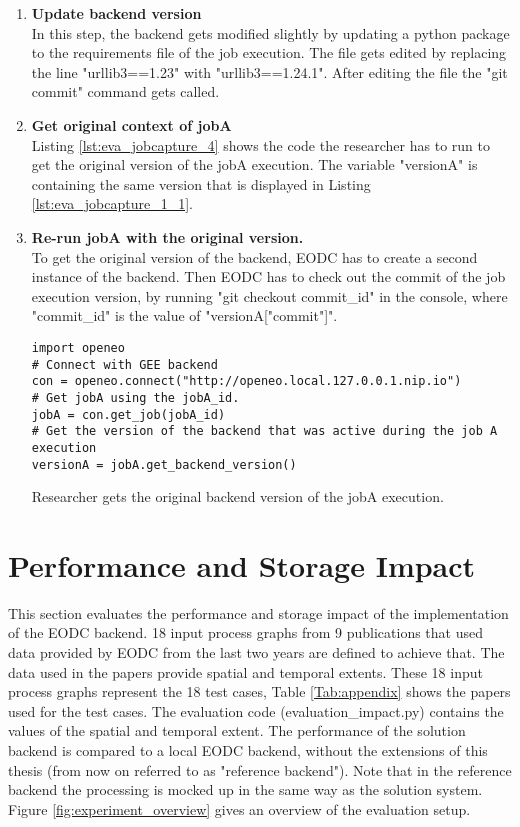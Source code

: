 \documentclass[draft,final]{vutinfth} %
\newenvironment{code}{\captionsetup{type=listing}}{}
\begin{document}
\begin{enumerate}
	\item \textbf{Update backend version} \\
	In this step, the backend gets modified slightly by updating a python package to the requirements file of the job execution. The file gets edited by replacing the line "urllib3==1.23" with "urllib3==1.24.1". After editing the file the "git commit" command gets called. 
	\item \textbf{Get original context of jobA} \\
	Listing \ref{lst:eva_jobcapture_4} shows the code the researcher has to run to get the original version of the jobA execution. The variable "versionA" is containing the same version that is displayed in Listing \ref{lst:eva_jobcapture_1_1}. 
	\item \textbf{Re-run jobA with the original version.} \\
	To get the original version of the backend, EODC has to create a second instance of the backend. Then EODC has to check out the commit of the job execution version, by running "git checkout commit\_id" in the console, where "commit\_id" is the value of "versionA["commit"]".
	\begin{code}
		\begin{verbatim}
import openeo
# Connect with GEE backend
con = openeo.connect("http://openeo.local.127.0.0.1.nip.io")
# Get jobA using the jobA_id.
jobA = con.get_job(jobA_id)
# Get the version of the backend that was active during the job A execution
versionA = jobA.get_backend_version()
		\end{verbatim}
		\caption{Researcher gets the original backend version of the jobA execution.}
		\label{lst:eva_jobcapture_4}
	\end{code}	
	
\end{enumerate}

\section{Performance and Storage Impact}\label{Evaluation:impact}

This section evaluates the performance and storage impact of the implementation of the EODC backend. 18 input process graphs from 9 publications that used data provided by EODC from the last two years are defined to achieve that. The data used in the papers provide spatial and temporal extents. These 18 input process graphs represent the 18 test cases, Table \ref{Tab:appendix} shows the papers used for the test cases. The evaluation code (evaluation\_impact.py) contains the values of the spatial and temporal extent. The performance of the solution backend is compared to a local EODC backend, without the extensions of this thesis (from now on referred to as "reference backend"). Note that in the reference backend the processing is mocked up in the same way as the solution system. Figure \ref{fig:experiment_overview} gives an overview of the evaluation setup.  
\end{document}
